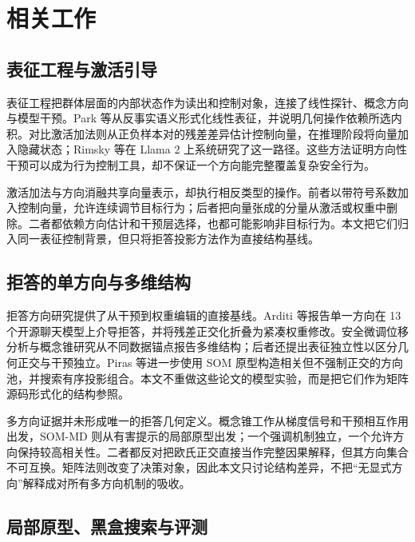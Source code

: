 \section{相关工作}
\label{sec:related-work}

\subsection{表征工程与激活引导}

表征工程把群体层面的内部状态作为读出和控制对象，连接了线性探针、概念方向与模型干预\cite{zou2025representation}。Park 等从反事实语义形式化线性表征，并说明几何操作依赖所选内积\cite{park2024linear}。对比激活加法则从正负样本对的残差差异估计控制向量，在推理阶段将向量加入隐藏状态\cite{turner2023activation}；Rimsky 等在 Llama 2 上系统研究了这一路径\cite{rimsky2024steering}。这些方法证明方向性干预可以成为行为控制工具，却不保证一个方向能完整覆盖复杂安全行为。

激活加法与方向消融共享向量表示，却执行相反类型的操作。前者以带符号系数加入控制向量，允许连续调节目标行为；后者把向量张成的分量从激活或权重中删除。二者都依赖方向估计和干预层选择，也都可能影响非目标行为。本文把它们归入同一表征控制背景，但只将拒答投影方法作为直接结构基线。

\subsection{拒答的单方向与多维结构}

拒答方向研究提供了从干预到权重编辑的直接基线。Arditi 等报告单一方向在 13 个开源聊天模型上介导拒答，并将残差正交化折叠为紧凑权重修改\cite{arditi2024refusal}。安全微调位移分析与概念锥研究从不同数据锚点报告多维结构\cite{pan2025hidden,wollschlager2025geometry}；后者还提出表征独立性以区分几何正交与干预独立。Piras 等进一步使用 SOM 原型构造相关但不强制正交的方向池，并搜索有序投影组合\cite{piras2026som}。本文不重做这些论文的模型实验，而是把它们作为矩阵源码形式化的结构参照。

多方向证据并未形成唯一的拒答几何定义。概念锥工作从梯度信号和干预相互作用出发，SOM-MD 则从有害提示的局部原型出发；一个强调机制独立，一个允许方向保持较高相关性。二者都反对把欧氏正交直接当作完整因果解释，但其方向集合不可互换。矩阵法则改变了决策对象，因此本文只讨论结构差异，不把“无显式方向”解释成对所有多方向机制的吸收。

\subsection{局部原型、黑盒搜索与评测}

